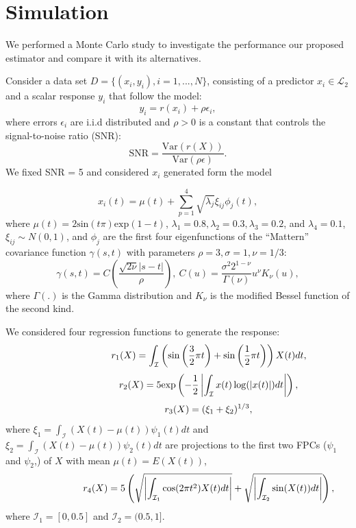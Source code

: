    \section{Simulation} 
We performed a Monte Carlo study to investigate the performance our proposed estimator and compare it with its alternatives. 

Consider a data set $D = \{(x_i, y_i), i = 1,..., N\}$, consisting of a predictor $x_i\in\mathcal{L}_2$ and a scalar response $y_i$ that follow the model: 
 \begin{equation} \label{eq:gen}
y_i = r(x_i) + \rho \epsilon_i,
\end{equation}
where errors $\epsilon_i$ are i.i.d distributed and  $\rho > 0$ is a constant that controls the signal-to-noise ratio (SNR): 
$$\text{SNR} = \frac{\text{Var}(r(X))}{\text{Var}(\rho\epsilon)}.$$
We fixed SNR = 5 and considered $x_i$ generated form the model 

 $$x_i(t) = \mu(t) + \sum_{p=1}^4 \sqrt{\lambda_j}\xi_{ij}\phi_j(t),$$
where $\mu(t) = 2\text{sin}(t\pi) \text{exp}(1-t)$, $\lambda_1 = 0.8, \lambda_2 = 0.3, \lambda_3 = 0.2$, and $\lambda_4 = 0.1$,  $\xi_{ij}\sim N(0,1) $,  and $\phi_j$ are the first four eigenfunctions of the ``Mattern'' covariance function $\gamma(s,t)$ with parameters $\rho = 3, \sigma = 1, \nu = 1/3$: 
 $$\gamma(s,t) = C\left(\frac{\sqrt{2\nu}|s-t|}{\rho}\right), \ C(u) = \frac{\sigma^2 2^{1-\nu}}{\Gamma(\nu)} u^{\nu} K_{\nu}(u),$$
  where $\Gamma(.)$ is the Gamma distribution and $K_{\nu}$ is the modified Bessel function of the second kind.
  
 We considered four regression functions to generate the response: 
\mathleft
\begin{equation*}
\hspace{15ex}
	r_1(X) =  \int_{\mathcal{I}} \left (\text{sin} \left(\frac{3}{2} \pi t \right) +  \text{sin} \left(\frac{1}{2} \pi t \right)\right)X(t)dt,
\end{equation*}
\mathleft
\begin{equation*}
\hspace{15ex}
	r_2(X) = 5\text{exp}\left (- \frac{1}{2}\left| \int_{\mathcal{I}} x(t)\log(|x(t)|)dt \right| \right),
\end{equation*}
\mathleft
\begin{equation*}
\hspace{15ex}
r_3(X) = (\xi_1 + \xi_2)^{1/3},
\end{equation*}
where  $\xi_1 = \int_{\mathcal{I}} (X(t) - \mu(t))\psi_1(t) dt$ and $\xi_2 = \int_{\mathcal{I}} (X(t) - \mu(t))\psi_2(t) dt$ are projections to the first two FPCs ($\psi_1$ and $\psi_2$,) of $X$ with mean  $\mu(t) = E(X(t))$, 
\begin{equation*}
\hspace{15ex}
r_4(X) = 5 \left( \sqrt{\left|\int_{\mathcal{I}_1} \text{cos}(2\pi t^2) X(t) dt \right|} + \sqrt{\left|\int_{\mathcal{I}_2} \text{sin}(X(t)) dt \right|} \right),
\end{equation*}
where  $\mathcal{I}_1 = [0,0.5]$ and $\mathcal{I}_2 = (0.5,1]$. 



